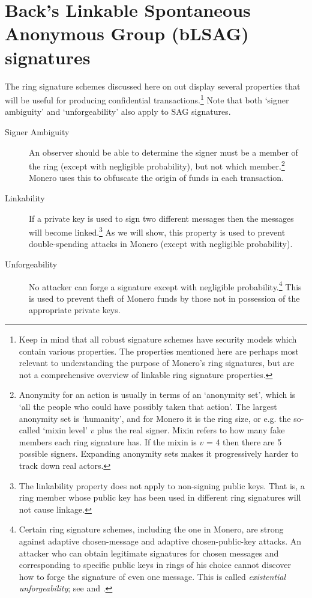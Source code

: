 \section{Back's Linkable Spontaneous Anonymous Group (bLSAG) signatures}
\label{blsag_note}

The ring signature schemes discussed here on out display several properties that will be useful for producing confidential transactions.\footnote{Keep in mind that all robust signature schemes have security models which contain various properties. The properties mentioned here are perhaps most relevant to understanding the purpose of Monero's ring signatures, but are not a comprehensive overview of linkable ring signature properties.} Note that both `signer ambiguity' and `unforgeability' also apply to SAG signatures.

\begin{description}
	\item[Signer Ambiguity]
	An observer should be able to determine the signer must be a member of the ring (except with negligible probability), but not which member.\footnote{\label{anonymity_note}Anonymity for an action is usually in terms of an `anonymity set’, which is `all the people who could have possibly taken that action’. The largest anonymity set is `humanity’, and for Monero it is the ring size, or e.g. the so-called `mixin level' $v$ plus the real signer. Mixin refers to how many fake members each ring signature has. If the mixin is $v$ = 4 then there are 5 possible signers. Expanding anonymity sets makes it progressively harder to track down real actors.} Monero uses this to obfuscate the origin of funds in each transaction.

	\item[Linkability]
	If a private key is used to sign two different messages then the messages will become linked.\footnote{\label{linkability_note}The linkability property does not apply to non-signing public keys. That is, a ring member whose public key has been used in different ring signatures will not cause linkage.} As we will show, this property is used to prevent double-spending attacks in Monero (except with negligible probability).

	\item[Unforgeability]
    No attacker can forge a signature except with negligible probability.\footnote{\label{unforgeability_note}Certain ring signature schemes, including the one in Monero, are strong against adaptive chosen-message and adaptive chosen-public-key attacks. An attacker who can obtain legitimate signatures for chosen messages and corresponding to specific public keys in rings of his choice cannot discover how to forge the signature of even one message. This is called {\em existential unforgeability}; see \cite{MRL-0005-ringct} and \cite{Liu2004}.} This is used to prevent theft of Monero funds by those not in possession of the appropriate private keys.
\end{description}

